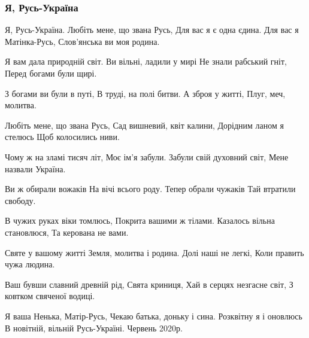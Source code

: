  
 
 

\subsubsection{Я, Русь-Україна}
\label{sec:poetry.rus.sokor.matinka_rus}


Я, Русь-Україна.
Любіть мене, що звана Русь,
Для вас я є одна єдина.
Для вас я Матінка-Русь,
Слов'янська ви моя родина.

Я вам дала природній світ.
Ви вільні, ладили у мирі
Не знали рабський гніт,
Перед богами були щирі.

З богами ви були в путі,
В труді, на полі битви.
А зброя у житті,
Плуг, меч, молитва.

Любіть мене, що звана Русь,
Сад вишневий, квіт калини,
Дорідним ланом я стелюсь
Щоб колосились ниви.

Чому ж на зламі тисяч літ,
Моє ім'я забули.
Забули свій духовний світ,
Мене назвали Україна.

Ви ж обирали вожаків
На вічі всього роду.
Тепер обрали чужаків
Тай втратили свободу.

В чужих руках віки томлюсь,
Покрита вашими ж тілами.
Казалось вільна становлюся,
Та керована не вами.

Святе у вашому житті
Земля, молитва і родина.
Долі наші не легкі,
Коли править чужа людина.

Ваш бувши славний древній рід,
Свята криниця,
Хай в серцях незгасне світ,
З ковтком свяченої водиці.

Я ваша Ненька, Матір-Русь,
Чекаю батька, доньку і сина.
Розквітну я і оновлюсь
В новітній, вільній Русь-Україні.
Червень 2020р.

